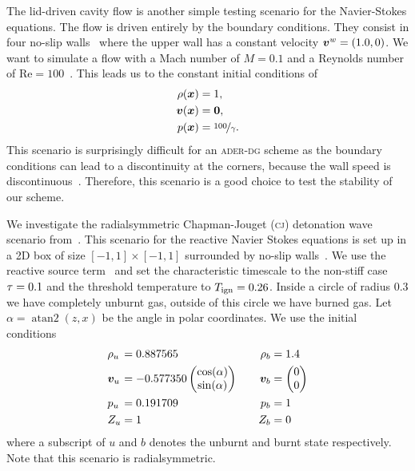 The lid-driven cavity flow is another simple testing scenario for the Navier-Stokes equations.
The flow is driven entirely by the boundary conditions.
They consist in four no-slip walls~ where the upper wall has a constant velocity $\bm{v}^w = (1.0, 0)$.
We want to simulate a flow with a Mach number of $M = 0.1$ and a Reynolds number of $\text{Re} = 100$~\cite{fambri2017space}.
This leads us to the constant initial conditions of
\begin{align}
  \label{eq:lid-driven-cavity}
  \begin{split}
  \rho(\bm{x}) &= 1,\\
  \bm{v}(\bm{x}) &=  \bm{0},\\
  p(\bm{x}) &= \nicefrac{100}{\gamma}.
  \end{split}
\end{align}
This scenario is surprisingly difficult for an \textsc{ader-dg} scheme as the boundary conditions can lead to a discontinuity at the corners, because the wall speed is discontinuous~\cite{fambri2017space}.
Therefore, this scenario is a good choice to test the stability of our scheme.

We investigate the radialsymmetric Chapman-Jouget (\textsc{cj}) detonation wave scenario from~\cite{helzel2000modified}.
This scenario for the reactive Navier Stokes equations is set up in a 2D box of size $[-1, 1] \times [-1, 1]$ surrounded by no-slip walls~.
We use the reactive source term~ and set the characteristic timescale to the non-stiff case $\tau = 0.1$ and the threshold temperature to $T_{\text{ign}} = 0.26$.
Inside a circle of radius $0.3$ we have completely unburnt gas, outside of this circle we have burned gas.
Let $\alpha =  \operatorname{atan2}(z,x)$ be the angle in polar coordinates.
We use the initial conditions
\begin{equation}\label{eq:cj-detonation}
\begin{alignedat}{6}
  & \rho_u &&= 0.887565 \qquad& \rho_b &= 1.4\\
  & \bm{v}_u &&= -0.577350
  \begin{pmatrix}
     \cos (\alpha)\\
     \sin (\alpha)
   \end{pmatrix}  \qquad& \bm{v}_b  &=
   \begin{pmatrix}
     0 \\
     0
   \end{pmatrix}\\
   & p_u &&=0.191709 \qquad& p_b &= 1\\
   & Z_u &&= 1 \quad& Z_b &= 0
  \end{alignedat}
\end{equation}
where a subscript of $u$ and $b$ denotes the unburnt and burnt state respectively.
Note that this scenario is radialsymmetric.

